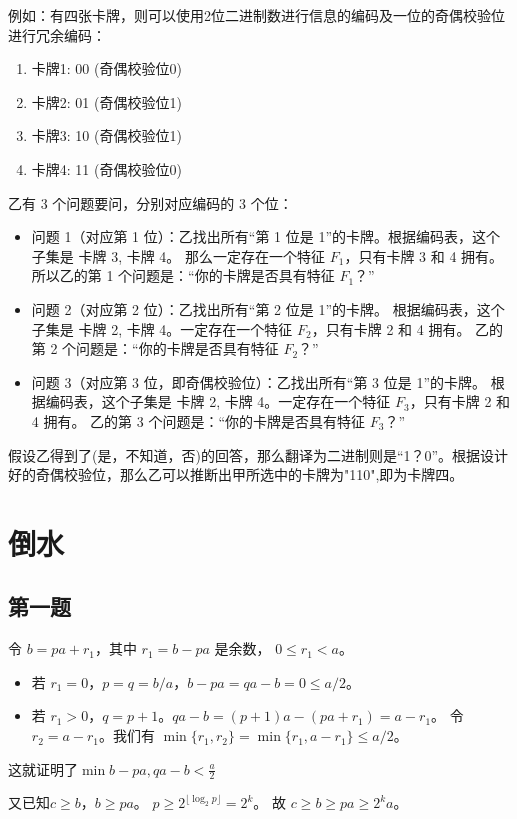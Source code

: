 \documentclass{ctexart}
\begin{document}
例如：有四张卡牌，则可以使用2位二进制数进行信息的编码及一位的奇偶校验位进行冗余编码：
\begin{enumerate}
    \item 卡牌1: 00 (奇偶校验位0)
    \item 卡牌2: 01 (奇偶校验位1)
    \item 卡牌3: 10 (奇偶校验位1)
    \item 卡牌4: 11 (奇偶校验位0)
\end{enumerate}
乙有 3 个问题要问，分别对应编码的 3 个位：
\begin{itemize}
    \item 问题 1（对应第 1 位）：乙找出所有“第 1 位是 1”的卡牌。根据编码表，这个子集是 {卡牌 3, 卡牌 4}。
    那么一定存在一个特征 $F_1$，只有卡牌 3 和 4 拥有。
    所以乙的第 1 个问题是：“你的卡牌是否具有特征 $F_1$？”
    \item 问题 2（对应第 2 位）：乙找出所有“第 2 位是 1”的卡牌。
    根据编码表，这个子集是 {卡牌 2, 卡牌 4}。一定存在一个特征 $F_2$，只有卡牌 2 和 4 拥有。
    乙的第 2 个问题是：“你的卡牌是否具有特征 $F_2$？”
    \item 问题 3（对应第 3 位，即奇偶校验位）：乙找出所有“第 3 位是 1”的卡牌。
    根据编码表，这个子集是 {卡牌 2, 卡牌 4}。一定存在一个特征 $F_3$，只有卡牌 2 和 4 拥有。
    乙的第 3 个问题是：“你的卡牌是否具有特征 $F_3$？”
\end{itemize}
假设乙得到了(是，不知道，否)的回答，那么翻译为二进制则是``1？0''。根据设计好的奇偶校验位，那么乙可以推断出甲所选中的卡牌为"110",即为卡牌四。


\section{倒水}
\subsection{第一题}
令 $b = pa + r_1$，其中 $r_1 = b-pa$ 是余数， $0 \le r_1 < a$。
\begin{itemize}
    \item 若 $r_1 = 0$，$p=q=b/a$，$b-pa = qa-b = 0 \le a/2$。
    \item 若 $r_1 > 0$，$q = p+1$。$qa-b = (p+1)a - (pa+r_1) = a - r_1$。
    令 $r_2 = a-r_1$。我们有 $\min\{r_1, r_2\} = \min\{r_1, a-r_1\} \le a/2$。
\end{itemize}
这就证明了$\min{b - pa, qa - b} < \frac{a}{2}$

又已知$c \ge b$，$b \ge pa$。 $p \ge 2^{\lfloor \log_2 p \rfloor} = 2^k$。
故 $c \ge b \ge pa \ge 2^k a$。
\end{document}
